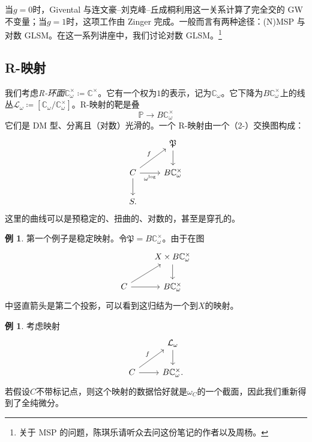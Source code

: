\documentclass{amsart}
\theoremstyle{definition}
\newtheorem{exm}[thm]{例}
\theoremstyle{remark}
\theoremstyle{plain}
\theoremstyle{definition}
\theoremstyle{remark}
\newcommand{\C}{\mathbb{C}}
\renewcommand{\P}{\mathbb{P}}
\newcommand{\mc}[1]{\mathcal{#1}}
\newcommand{\mf}[1]{\mathfrak{#1}}
\newcommand{\1}{\mathbf{1}}
\newcommand{\2}{\mathbf{2}}
\newcommand{\3}{\mathbf{3}}
\begin{document}
当\(g = 0\)时，Givental 与连文豪--刘克峰--丘成桐利用这一关系计算了完全交的 GW 不变量；当\(g = 1\)时，这项工作由 Zinger 完成。一般而言有两种途径：(N)MSP 与对数 GLSM。在这一系列讲座中，我们讨论对数 GLSM。\footnote{关于 MSP 的问题，陈琪乐请听众去问这份笔记的作者以及周杨。}

\subsection{R-映射}%
\label{sub:R-maps}

我们考虑\textit{R-环面}\(\C^{\times}_{\omega} \coloneqq \C^{\times}\)。它有一个权为\(1\)的表示，记为\(\C_{\omega}\)。它下降为\(B \C_{\omega}^{\times}\)上的线丛\(\mc{L}_{\omega} \coloneqq [\C_{\omega} / \C^{\times}_{\omega}]\)。R-映射的靶是叠
\[ \P \to B \C^{\times}_{\omega} \]
它们是 DM 型、分离且（对数）光滑的。一个 R-映射由一个（2-）交换图构成：
\begin{equation*}
\begin{tikzcd}
    & \mf{P} \ar{d} \\
    C \ar{ur}{f} \ar{r}[swap]{\omega^{\log}} \ar{d} & B \C_{\omega}^{\times} \\
    S.
\end{tikzcd}
\end{equation*}
这里的曲线可以是预稳定的、扭曲的、对数的，甚至是穿孔的。

\begin{exm}
    第一个例子是稳定映射。令\(\mf{P} = B\C_{\omega}^{\times}\)。由于在图
    \begin{equation*}
    \begin{tikzcd}
        & X \times B\C_{\omega}^{\times} \ar{d} \\
        C \ar{ur} \ar{r} & B \C_{\omega}^{\times}
    \end{tikzcd}
    \end{equation*}
    中竖直箭头是第二个投影，可以看到这归结为一个到\(X\)的映射。
\end{exm}

\begin{exm}
    考虑映射
    \begin{equation*}
    \begin{tikzcd}
        & \mc{L}_{\omega} \ar{d} \\
        C \ar{ur}{f} \ar{r} & B \C_{\omega}^{\times}.
    \end{tikzcd}
    \end{equation*}
    若假设\(C\)不带标记点，则这个映射的数据恰好就是\(\omega_C\)的一个截面，因此我们重新得到了全纯微分。
\end{exm}
\end{document}
